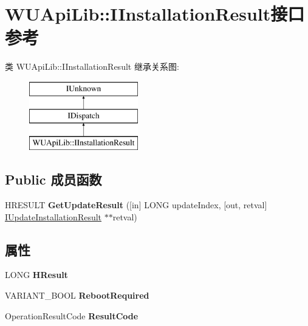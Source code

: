 \hypertarget{interface_w_u_api_lib_1_1_i_installation_result}{}\section{W\+U\+Api\+Lib\+:\+:I\+Installation\+Result接口 参考}
\label{interface_w_u_api_lib_1_1_i_installation_result}
类 W\+U\+Api\+Lib\+:\+:I\+Installation\+Result 继承关系图\+:\begin{figure}[H]
\begin{center}
\leavevmode
\includegraphics[height=3.000000cm]{interface_w_u_api_lib_1_1_i_installation_result}
\end{center}
\end{figure}
\subsection*{Public 成员函数}
\begin{DoxyCompactItemize}
\item 
\mbox{\label{interface_w_u_api_lib_1_1_i_installation_result_afdc7ff5153acf891c643b68d7d4b2c26}} 
H\+R\+E\+S\+U\+LT {\bfseries Get\+Update\+Result} (\mbox{[}in\mbox{]} L\+O\+NG update\+Index, \mbox{[}out, retval\mbox{]} \hyperlink{interface_w_u_api_lib_1_1_i_update_installation_result}{I\+Update\+Installation\+Result} $\ast$$\ast$retval)
\end{DoxyCompactItemize}
\subsection*{属性}
\begin{DoxyCompactItemize}
\item 
\mbox{\label{interface_w_u_api_lib_1_1_i_installation_result_a1d53546313967436149dc09c98209de9}} 
L\+O\+NG {\bfseries H\+Result}
\item 
\mbox{\label{interface_w_u_api_lib_1_1_i_installation_result_a157897d92fc20e37103306eb93a908df}} 
V\+A\+R\+I\+A\+N\+T\+\_\+\+B\+O\+OL {\bfseries Reboot\+Required}
\item 
\mbox{\label{interface_w_u_api_lib_1_1_i_installation_result_a1caa820e622a5b7e115746c4b38528fa}} 
Operation\+Result\+Code {\bfseries Result\+Code}
\end{DoxyCompactItemize}
